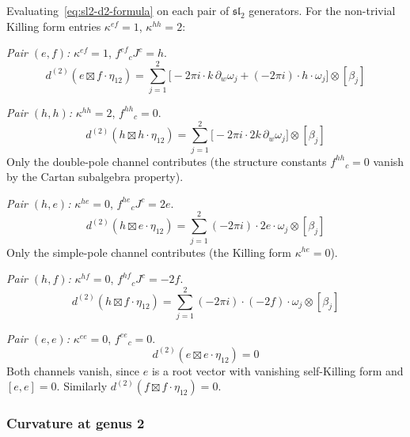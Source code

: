 \begin{computation}
\label{comp:sl2-d2-basis}
Evaluating~\eqref{eq:sl2-d2-formula} on each pair of
$\mathfrak{sl}_2$ generators. For
the non-trivial Killing form entries $\kappa^{ef} = 1$, $\kappa^{hh} = 2$:

\medskip\noindent
\emph{Pair $(e, f)$:} $\kappa^{ef} = 1$, $f^{ef}{}_c J^c = h$.
\begin{equation}\label{eq:d2-ef}
d^{(2)}(e \boxtimes f \cdot \eta_{12})
= \sum_{j=1}^{2} \bigl[
 -2\pi i \cdot k\, \partial_w\omega_j
 + (-2\pi i) \cdot h \cdot \omega_j
\bigr] \otimes [\beta_j]
\end{equation}

\emph{Pair $(h, h)$:} $\kappa^{hh} = 2$, $f^{hh}{}_c = 0$.
\begin{equation}\label{eq:d2-hh}
d^{(2)}(h \boxtimes h \cdot \eta_{12})
= \sum_{j=1}^{2} \bigl[
 -2\pi i \cdot 2k\, \partial_w\omega_j
\bigr] \otimes [\beta_j]
\end{equation}
Only the double-pole channel contributes (the structure constants
$f^{hh}{}_c = 0$ vanish by the Cartan subalgebra property).

\medskip\noindent
\emph{Pair $(h, e)$:} $\kappa^{he} = 0$, $f^{he}{}_c J^c = 2e$.
\begin{equation}\label{eq:d2-he}
d^{(2)}(h \boxtimes e \cdot \eta_{12})
= \sum_{j=1}^{2} (-2\pi i) \cdot 2e \cdot \omega_j \otimes [\beta_j]
\end{equation}
Only the simple-pole channel contributes (the Killing form
$\kappa^{he} = 0$).

\medskip\noindent
\emph{Pair $(h, f)$:} $\kappa^{hf} = 0$, $f^{hf}{}_c J^c = -2f$.
\begin{equation}\label{eq:d2-hf}
d^{(2)}(h \boxtimes f \cdot \eta_{12})
= \sum_{j=1}^{2} (-2\pi i) \cdot (-2f) \cdot \omega_j \otimes [\beta_j]
\end{equation}

\medskip\noindent
\emph{Pair $(e, e)$:} $\kappa^{ee} = 0$, $f^{ee}{}_c = 0$.
\begin{equation}\label{eq:d2-ee}
d^{(2)}(e \boxtimes e \cdot \eta_{12}) = 0
\end{equation}
Both channels vanish, since $e$ is a root vector with vanishing
self-Killing form and $[e, e] = 0$. Similarly
$d^{(2)}(f \boxtimes f \cdot \eta_{12}) = 0$.
\end{computation}

\subsubsection{Curvature at genus 2}

